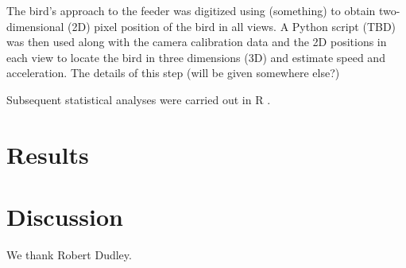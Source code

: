 \documentclass{rspublic}
\begin{document}
The bird's approach to the feeder was digitized using (something) to obtain two-dimensional (2D) pixel position of the bird in all views.  A Python script (TBD) was then used along with the camera calibration data and the 2D positions in each view to locate the bird in three dimensions (3D) and estimate speed and acceleration. The details of this step (will be given somewhere else?)    

Subsequent statistical analyses were carried out in R \citep{R}. 

\section{Results}
\section{Discussion}


\begin{acknowledgements}
We thank Robert Dudley.
\end{acknowledgements}


\label{lastpage}
\end{document}
